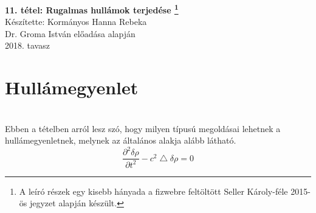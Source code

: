 \documentclass[a4paper]{article}
\begin{document}
\begin{titlepage}
	\begin{center}
		\vspace{1 cm}
		\Huge{\textbf{11. tétel: Rugalmas hullámok terjedése \footnote{A leíró részek egy kisebb hányada a fizwebre feltöltött Seller Károly-féle 2015-ös jegyzet alapján készült.}\\ }}
		\vspace{5 cm}
		\Large{Készítette: Kormányos Hanna Rebeka\\
				Dr. Groma István előadása alapján\\ 
				2018. tavasz}
	\end{center}
	
\end{titlepage}



\section*{Hullámegyenlet}
\\
Ebben a tételben arról lesz szó, hogy milyen típusú megoldásai lehetnek a hullámegyenletnek, melynek az általános alakja alább látható.
\begin{equation}
\frac{\partial^2 \delta\rho}{\partial t^2}-c^2\bigtriangleup\delta\rho=0
\end{equation}
\end{document}
